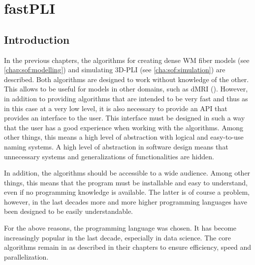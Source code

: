 \setcounter{chapter}{5}
\chapter{\acs{fastPLI}}
\label{chap:Software}
%
%
%
%
% 
\section{Introduction}\label{sec:fastpliIntro}
%
In the previous chapters, the algorithms for creating dense \ac{WM} fiber models (see \cref{chap:sof:modelling}) and simulating \ac{3D-PLI} (see \cref{cha:sof:simulation}) are described.
Both algorithms are designed to work without knowledge of the other.
This allows \eg{} to be useful for models in other domains, such as \ac{dMRI} (\cite{Ginsburger2019,ginsburgerDis2019}).
However, in addition to providing algorithms that are intended to be very fast and thus as in this case at a very low level, it is also necessary to provide an \ac{API} that provides an interface to the user.
This interface must be designed in such a way that the user has a good experience when working with the algorithms.
Among other things, this means a high level of abstraction with logical and easy-to-use naming systems.
A high level of abstraction in software design means that unnecessary systems and generalizations of functionalities are hidden.
%
\par
%
In addition, the algorithms should be accessible to a wide audience.
Among other things, this means that the program must be installable and easy to understand, even if no programming knowledge is available.
The latter is of course a problem, however, in the last decades more and more higher programming languages have been designed to be easily understandable.
%
\par
%
For the above reasons, the \python{} programming language was chosen.
It has become increasingly popular in the last decade, especially in data science.
The core algorithms remain in \cpp{} as described in their chapters to ensure efficiency, speed and parallelization.
%
